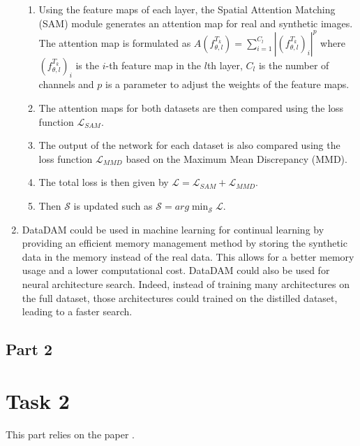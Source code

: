 \documentclass[onecolumn]{IEEEtran}
\begin{document}
\begin{enumerate}[label=(\alph*)]
\begin{enumerate}[label=(\arabic*)]
        \item Using the feature maps of each layer, the Spatial Attention Matching (SAM) module generates an attention map for real and synthetic images. The attention map is formulated as $A(f_{\theta,l}^{T_k}) = \sum_{i=1}^{C_l} | (f_{\theta,l}^{T_k})_i|^p$ where $(f_{\theta,l}^{T_k})_i$ is the $i$-th feature map in the $l$th layer, $C_l$ is the number of channels and $p$ is a parameter to adjust the weights of the feature maps.
        \item The attention maps for both datasets are then compared using the loss function $\mathcal{L}_{SAM}$.
        \item The output of the network for each dataset is also compared using the loss function $\mathcal{L}_{MMD}$ based on the Maximum Mean Discrepancy (MMD).
        \item The total loss is then given by $\mathcal{L} = \mathcal{L}_{SAM} + \mathcal{L}_{MMD}$.
        \item Then $\mathcal{S}$ is updated such as $\mathcal{S} = arg \min_{\mathcal{S}} \mathcal{L}$.
    \end{enumerate}
    \vspace{3mm}
    \item DataDAM could be used in machine learning for continual learning by providing an efficient memory management method by storing the synthetic data in the memory instead of the real data. This allows for a better memory usage and a lower computational cost. DataDAM could also be used for neural architecture search. Indeed, instead of training many architectures on the full dataset, those architectures could trained on the distilled dataset, leading to a faster search.
\end{enumerate}

\subsection{Part 2}

\section{Task 2}
This part relies on the paper \cite{li2024prioritize}.
\end{document}
